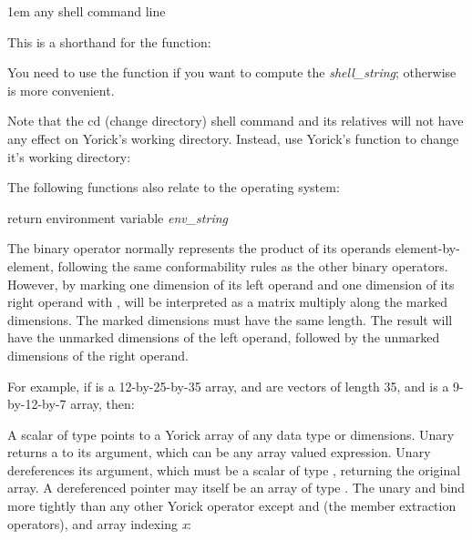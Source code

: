 \hglue1em \kbd{\$}any shell command line

This is a shorthand for the  function:


You need to use the  function if you want to compute the
{\it shell\_string}; otherwise \kbd{\$} is more convenient.

Note that the cd (change directory) shell command and its relatives
will not have any effect on Yorick's working directory.  Instead, use
Yorick's  function to change it's working directory:


The following functions also relate to the operating system:

     {return environment variable {\it env\_string\/}}

\shortcopyrightnotice


The \kbd{*} binary operator normally represents the product of its
operands element-by-element, following the same conformability rules
as the other binary operators.  However, by marking one dimension of
its left operand and one dimension of its right operand with \kbd{+},
\kbd{*} will be interpreted as a matrix multiply along the marked
dimensions.  The marked dimensions must have the same length.  The result
will have the unmarked dimensions of the left operand, followed by the
unmarked dimensions of the right operand.

For example, if  is a 12-by-25-by-35 array,  and  are
vectors of length 35, and  is a 9-by-12-by-7 array, then:



A scalar of type  points to a Yorick array of any data
type or dimensions.  Unary \kbd{\&} returns a  to its
argument, which can be any array valued expression.  Unary \kbd{*}
dereferences its argument, which must be a scalar of type
, returning the original array.  A dereferenced pointer
may itself be an array of type .  The unary \kbd{\&} and
\kbd{*} bind more tightly than any other Yorick operator except
 and \kbd{->} (the member extraction operators), and array
indexing {\it x\/}:

